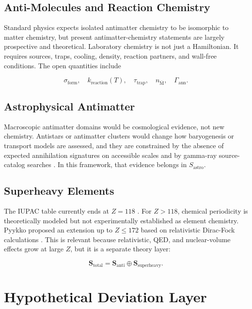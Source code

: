 \documentclass[11pt,a4paper]{article}
\begin{document}
\subsection{Anti-Molecules and Reaction Chemistry}

Standard physics expects isolated antimatter chemistry to be isomorphic to matter chemistry, but present antimatter-chemistry statements are largely prospective and theoretical. Laboratory chemistry is not just a Hamiltonian. It requires sources, traps, cooling, density, reaction partners, and wall-free conditions. The open quantities include

\begin{equation}
\sigma_{\mathrm{form}},
\quad
k_{\mathrm{reaction}}(T),
\quad
\tau_{\mathrm{trap}},
\quad
n_{\overline{\mathrm{M}}},
\quad
\Gamma_{\mathrm{ann}} .
\end{equation}

\subsection{Astrophysical Antimatter}

Macroscopic antimatter domains would be cosmological evidence, not new chemistry. Antistars or antimatter clusters would change how baryogenesis or transport models are assessed, and they are constrained by the absence of expected annihilation signatures on accessible scales and by gamma-ray source-catalog searches \cite{Cohen1998,Dupourque2021}. In this framework, that evidence belongs in $S_{\mathrm{astro}}$.

\subsection{Superheavy Elements}

The IUPAC table currently ends at $Z=118$ \cite{IUPAC113118}. For $Z>118$, chemical periodicity is theoretically modeled but not experimentally established as element chemistry. Pyykko proposed an extension up to $Z\leq172$ based on relativistic Dirac-Fock calculations \cite{Pyykko2011}. This is relevant because relativistic, QED, and nuclear-volume effects grow at large $Z$, but it is a separate theory layer:

\begin{equation}
\mathbf{S}_{\mathrm{total}}
=
\mathbf{S}_{\mathrm{anti}}
\oplus
\mathbf{S}_{\mathrm{superheavy}} .
\end{equation}

\section{Hypothetical Deviation Layer}
\end{document}
